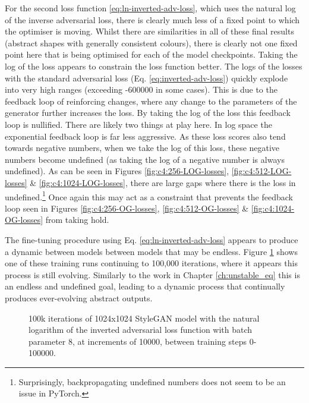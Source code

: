 For the second loss function \ref{eq:ln-inverted-adv-loss}, which uses the natural log of the inverse adversarial loss, there is clearly much less of a fixed point to which the optimiser is moving. 
Whilst there are similarities in all of these final results (abstract shapes with generally consistent colours), there is clearly not one fixed point here that is being optimised for each of the model checkpoints.
Taking the log of the loss appears to constrain the loss function better.
The logs of the losses with the standard adversarial loss (Eq. \ref{eq:inverted-adv-loss}) quickly explode into very high ranges (exceeding -600000 in some cases).
This is due to the feedback loop of reinforcing changes, where any change to the parameters of the generator further increases the loss.
By taking the log of the loss this feedback loop is nullified. 
There are likely two things at play here.
In log space the exponential feedback loop is far less aggressive. 
As these loss scores also tend towards negative numbers, when we take the log of this loss, these negative numbers become undefined (as taking the log of a negative number is always undefined).
As can be seen in Figures \ref{fig:c4:256-LOG-losses}, \ref{fig:c4:512-LOG-losses} \& \ref{fig:c4:1024-LOG-losses}, there are large gaps where there is the loss in undefined.\footnote{Surprisingly, backpropagating undefined numbers does not seem to be an issue in PyTorch.}
Once again this may act as a constraint that prevents the feedback loop seen in Figures \ref{fig:c4:256-OG-losses}, \ref{fig:c4:512-OG-losses} \& \ref{fig:c4:1024-OG-losses} from taking hold.

The fine-tuning procedure using Eq. \ref{eq:ln-inverted-adv-loss} appears to produce a dynamic between models between models that may be endless. 
Figure \ref{fig:c4:100k-iterations} shows one of these training runs continuing to 100,000 iterations, where it appears this process is still evolving.
Similarly to the work in Chapter \ref{ch:unstable_eq} this is an endless and undefined goal, leading to a dynamic process that continually produces ever-evolving abstract outputs.

\begin{figure}[!htbp]
  \centering
  \caption[100k iterations of 1024x1024 StyleGAN model with the natural logarithm of the inverted adversarial loss function]{100k iterations of 1024x1024 StyleGAN model with the natural logarithm of the inverted adversarial loss function with batch parameter 8, at increments of 10000, between training steps 0-100000.}
  \label{fig:c4:100k-iterations}
\end{figure}


